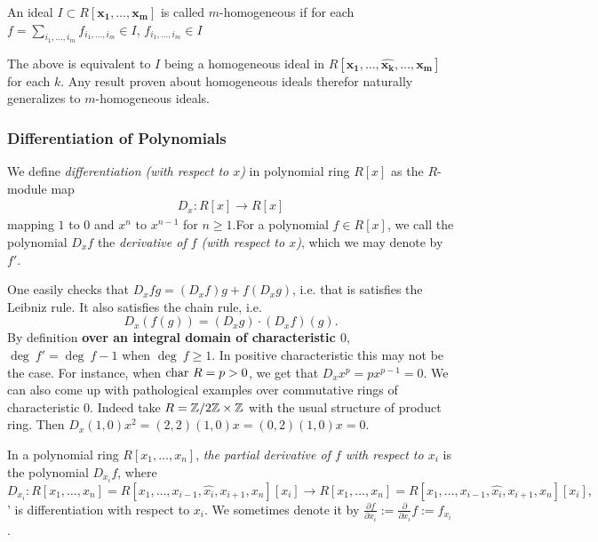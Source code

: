     \begin{definition}
        An ideal $I\subset R[\mathbf{x_1},\dots,\mathbf{x_m}]$ is called $m$-homogeneous if for each $f=\sum_{i_1,\dots,i_m} f_{i_1,\dots,i_m}\in I$, $f_{i_1,\dots,i_m}\in I$
    \end{definition}
    \begin{remark}\label{ImporatantRemarkForMultiprojectiveSpace}
        The above is equivalent to $I$ being a homogeneous ideal in $R[\mathbf{x_1},\dots, \widehat{\mathbf{x_k}},\dots,\mathbf{x_m}]$ for each $k$. Any result proven about homogeneous ideals therefor naturally generalizes to $m$-homogeneous ideals. 
    \end{remark}
\subsubsection{Differentiation of Polynomials}
\begin{definition}
    We define \textit{differentiation (with respect to $x$)} in polynomial ring $R[x]$ as the $R$-module map
    \begin{gather*}
        D_x : R[x]\rightarrow R[x]
    \end{gather*}
    mapping $1$ to $0$ and $x^n$ to $x^{n-1}$ for $n\geq 1$.For a polynomial $f\in R[x]$, we call the polynomial $D_xf$ the \textit{derivative of $f$ (with respect to $x$)}, which we may denote by $f'$.
\end{definition}
\begin{remark}
    One easily checks that $D_x fg = (D_xf)g+f(D_xg)$, i.e. that is satisfies the Leibniz rule. It also satisfies the chain rule, i.e. 
    $$D_x(f(g))=(D_xg)\cdot(D_xf)(g).$$
    By definition {\large \textbf{over an integral domain of characteristic $0$}}, $\deg \ f' = \deg \ f -1$ when $\deg \ f\geq 1$. In positive characteristic this may not be the case. For instance, when $\mathrm{char}\ R = p >0$, we get that $D_x x^p= px^{p-1}=0$. We can also come up with pathological examples over commutative rings of characteristic $0$. Indeed take $R=\mathbb{Z}/2\mathbb{Z} \times \mathbb{Z}$ with the usual structure of product ring. Then $D_x (1,0)x^2= (2,2)(1,0)x= (0,2)(1,0)x=0.$ 
\end{remark}
\begin{definition}
    In a polynomial ring $R[x_1,\dots,x_n]$, \textit{the partial derivative of $f$ with respect to $x_i$} is the polynomial $D_{x_i}f$, where 
    $$D_{x_i}: R[x_1,\dots,x_n]=R[x_1,\dots, x_{i-1},\widehat{x_i},x_{i+1},x_{n}][x_i]\rightarrow R[x_1,\dots,x_n]=R[x_1,\dots, x_{i-1},\widehat{x_i},x_{i+1},x_{n}][x_i],$$
'    is differentiation with respect to $x_i$. We sometimes denote it by $\frac{\partial f}{\partial x_i}:= \frac{\partial}{\partial x_i}f:= f_{x_i}$.
\end{definition}
